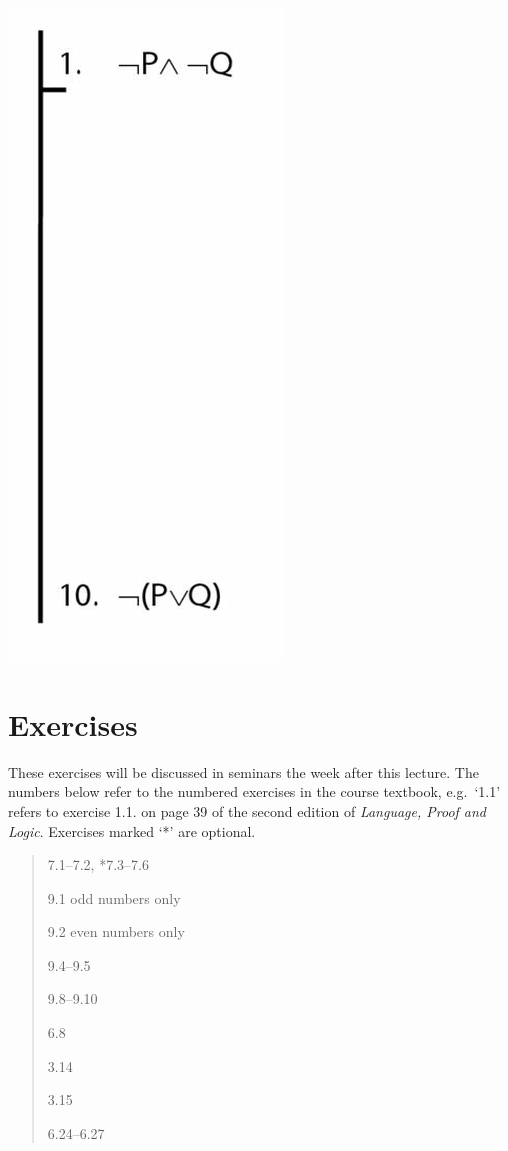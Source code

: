 \documentclass[12pt]{extarticle}
\begin{document}
\begin{multicols*}{3}
\begin{center}
\includegraphics[scale=0.3]{img/unit_821_proof2.png}
\end{center}
 
 
\vfill
\begin{minipage}{\columnwidth}
\section{Exercises}
These exercises will be discussed in seminars the week after this lecture.
The numbers below refer to the numbered exercises in the course textbook, e.g.\ `1.1' refers to exercise 1.1. on page 39 of the second edition of \emph{Language, Proof and Logic}. Exercises marked `*' are optional.
 
\begin{quote}
7.1--7.2, *7.3--7.6
 
9.1 odd numbers only
 
9.2 even numbers only
 
9.4--9.5
 
9.8--9.10
 
6.8
 
3.14
 
3.15
 
6.24--6.27
 
\end{quote}
\end{minipage}




 

 


\end{multicols*}
\end{document}
